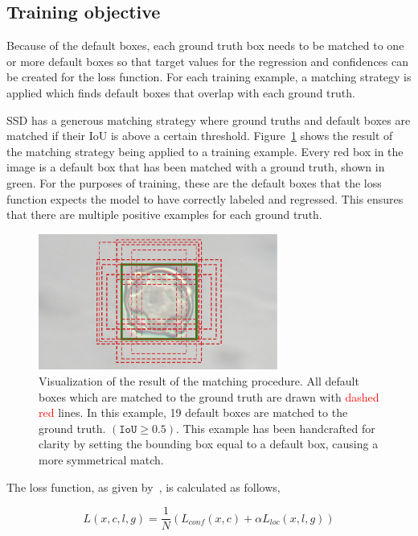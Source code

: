 \subsection{Training objective}
Because of the default boxes, each ground truth box needs to be matched to one or more default boxes so that target values for the regression and confidences can be created for the loss function.
For each training example, a matching strategy is applied which finds default boxes that overlap with each ground truth.

SSD has a generous matching strategy where ground truths and default boxes are matched if their IoU is above a certain threshold.
Figure~\ref{fig:priors} shows the result of the matching strategy being applied to a training example.
Every red box in the image is a default box that has been matched with a ground truth, shown in green.
For the purposes of training, these are the default boxes that the loss function expects the model to have correctly labeled and regressed.
This ensures that there are multiple positive examples for each ground truth.

\begin{figure}[htbp]
  \centering
  \includegraphics[width=0.7\textwidth]{figs/method/priors_matching.pdf}
  \caption[Default box matching]{Visualization of the result of the matching procedure.
  All default boxes which are matched to the \textcolor{nicegreen}{ground truth} are drawn with \textcolor{red}{dashed red} lines. In this example, 19 default boxes are matched to the ground truth. \((\texttt{IoU}\ge 0.5)\). This example has been handcrafted for clarity by setting the bounding box equal to a default box, causing a more symmetrical match.
}\label{fig:priors}
\end{figure}
The loss function, as given by\ \cite{liu_ssd_2016}, is calculated as follows,

\begin{equation}\label{eq:loss}
  L(x,c,l,g)=\frac{1}{N}\left( L_{conf}(x,c) + \alpha L_{loc}(x,l,g)\right)
\end{equation}


